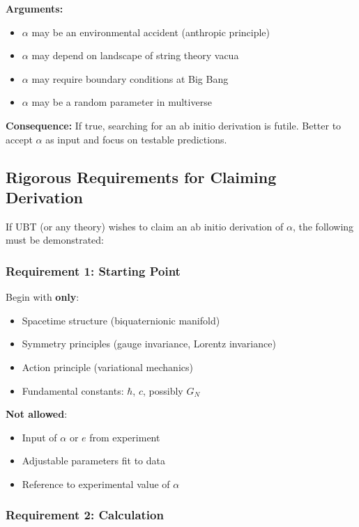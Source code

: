 \textbf{Arguments:}
\begin{itemize}
\item $\alpha$ may be an environmental accident (anthropic principle)
\item $\alpha$ may depend on landscape of string theory vacua
\item $\alpha$ may require boundary conditions at Big Bang
\item $\alpha$ may be a random parameter in multiverse
\end{itemize}

\textbf{Consequence:} If true, searching for an ab initio derivation is futile. Better to accept $\alpha$ as input and focus on testable predictions.

\subsection{Rigorous Requirements for Claiming Derivation}

If UBT (or any theory) wishes to claim an ab initio derivation of $\alpha$, the following must be demonstrated:

\subsubsection{Requirement 1: Starting Point}

Begin with \textbf{only}:
\begin{itemize}
\item Spacetime structure (biquaternionic manifold)
\item Symmetry principles (gauge invariance, Lorentz invariance)
\item Action principle (variational mechanics)
\item Fundamental constants: $\hbar$, $c$, possibly $G_N$
\end{itemize}

\textbf{Not allowed}:
\begin{itemize}
\item Input of $\alpha$ or $e$ from experiment
\item Adjustable parameters fit to data
\item Reference to experimental value of $\alpha$
\end{itemize}

\subsubsection{Requirement 2: Calculation}


